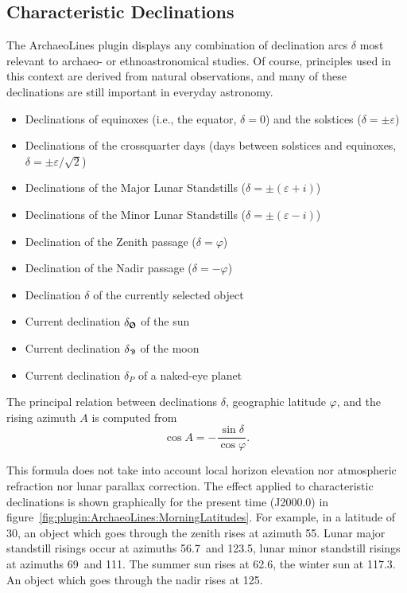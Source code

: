 \subsection{Characteristic Declinations}
\label{sec:plugin:ArchaeoLines:Declinations}


The ArchaeoLines plugin displays any combination of declination arcs $\delta$ most
relevant to archaeo- or ethnoastronomical studies. Of course, principles
used in this context are derived from natural observations, and many of
these declinations are still important in everyday astronomy.

\begin{itemize}
\item Declinations of equinoxes (i.e., the equator, $\delta=0$) and the solstices ($\delta=\pm\varepsilon$)
\item Declinations of the crossquarter days (days between solstices and equinoxes, $\delta=\pm\varepsilon/\sqrt2$)
\item Declinations of the Major Lunar Standstills ($\delta=\pm(\varepsilon+i)$)
\item Declinations of the Minor Lunar Standstills ($\delta=\pm(\varepsilon-i)$)
\item Declination of the Zenith passage ($\delta=\varphi$)
\item Declination of the Nadir passage ($\delta=-\varphi$)
\item Declination $\delta$ of the currently selected object 
\item Current declination $\delta_{\text{\Sun}}$ of the sun
\item Current declination $\delta_{\text{\Moon}}$ of the moon
\item Current declination $\delta_P$ of a naked-eye planet
\end{itemize}

The principal relation between declinations $\delta$, geographic
latitude $\varphi$, and the rising azimuth $A$ is computed from
\begin{equation}
  \label{eq:RisingAzimuth}
  \cos A=-\frac{\sin\delta}{\cos\varphi}.
\end{equation}

This formula does not take into account local horizon elevation nor
atmospheric refraction nor lunar parallax correction.  The effect
applied to characteristic declinations is shown graphically for the
present time (J2000.0) in
figure~\ref{fig:plugin:ArchaeoLines:MorningLatitudes}. For example, in
a latitude of 30\degree, an object which goes through the zenith rises
at azimuth 55\degree. Lunar major standstill risings occur at azimuths
56.7\degree\ and 123.5\degree, lunar minor standstill risings at
azimuths 69\degree\ and 111\degree. The summer sun rises at
62.6\degree, the winter sun at 117.3\degree. An object which goes
through the nadir rises at 125\degree.  

